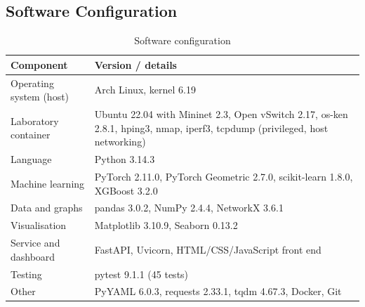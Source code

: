 \begin{appendices}
\section{Software Configuration}
\begin{table}[htbp]
\centering
\caption{Software configuration}
\label{tab:sw}
\small
\begin{tabularx}{\textwidth}{|p{4.2cm}|X|}
\hline
\textbf{Component} & \textbf{Version / details} \\ \hline
Operating system (host) & Arch Linux, kernel 6.19 \\ \hline
Laboratory container & Ubuntu 22.04 with Mininet 2.3, Open vSwitch 2.17, os-ken 2.8.1, hping3, nmap, iperf3, tcpdump (privileged, host networking) \\ \hline
Language & Python 3.14.3 \\ \hline
Machine learning & PyTorch 2.11.0, PyTorch Geometric 2.7.0, scikit-learn 1.8.0, XGBoost 3.2.0 \\ \hline
Data and graphs & pandas 3.0.2, NumPy 2.4.4, NetworkX 3.6.1 \\ \hline
Visualisation & Matplotlib 3.10.9, Seaborn 0.13.2 \\ \hline
Service and dashboard & FastAPI, Uvicorn, HTML/CSS/JavaScript front end \\ \hline
Testing & pytest 9.1.1 (45 tests) \\ \hline
Other & PyYAML 6.0.3, requests 2.33.1, tqdm 4.67.3, Docker, Git \\ \hline
\end{tabularx}
\end{table}


\end{appendices}
